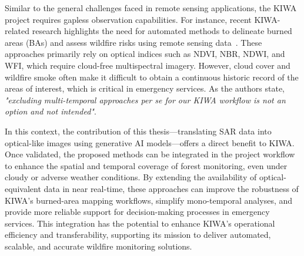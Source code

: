 Similar to the general challenges faced in remote sensing applications, the KIWA project requires gapless observation capabilities. For instance, recent KIWA-related research highlights the need for automated methods to delineate burned areas (BAs) and assess wildfire risks using remote sensing data~\cite{kiwa_auto_Delineation_BAs}. These approaches primarily rely on optical indices such as NDVI, NBR, NDWI, and WFI, which require cloud-free multispectral imagery. However, cloud cover and wildfire smoke often make it difficult to obtain a continuous historic record of the areas of interest, which is critical in emergency services. As the authors state, \textit{"excluding multi-temporal approaches per se for our KIWA workflow is not an option and not intended"}.

In this context, the contribution of this thesis—translating SAR data into optical-like images using generative AI models—offers a direct benefit to KIWA. Once validated, the proposed methods can be integrated in the project workflow to enhance the spatial and temporal coverage of forest monitoring, even under cloudy or adverse weather conditions. By extending the availability of optical-equivalent data in near real-time, these approaches can improve the robustness of KIWA’s burned-area mapping workflows, simplify mono-temporal analyses, and provide more reliable support for decision-making processes in emergency services. This integration has the potential to enhance KIWA’s operational efficiency and transferability, supporting its mission to deliver automated, scalable, and accurate wildfire monitoring solutions.

